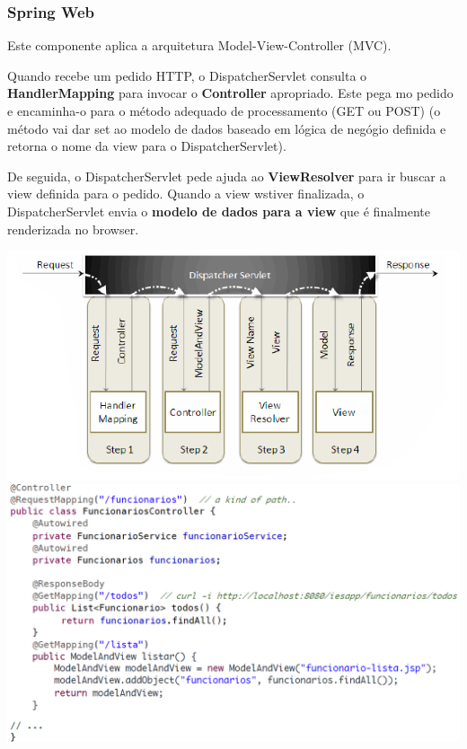 \documentclass{article}
\begin{document}
\subsubsection{Spring Web}

Este componente aplica a arquitetura Model-View-Controller (MVC).

\vspace{2mm}

Quando recebe um pedido HTTP, o DispatcherServlet consulta o
\textbf{HandlerMapping} para invocar o \textbf{Controller} apropriado.
Este pega mo pedido e encaminha-o para o método adequado de processamento
(GET ou POST) (o método vai dar set ao modelo de dados baseado em
lógica de negógio definida e retorna o nome da view para o DispatcherServlet).

De seguida, o DispatcherServlet pede ajuda ao \textbf{ViewResolver}
para ir buscar a view definida para o pedido. Quando a view wstiver finalizada,
o DispatcherServlet envia o \textbf{modelo de dados para a view}
que é finalmente renderizada no browser.

\begin{center}
  \includegraphics[scale=0.5]{87}
  \includegraphics[scale=0.5]{88}
\end{center}
\end{document}
